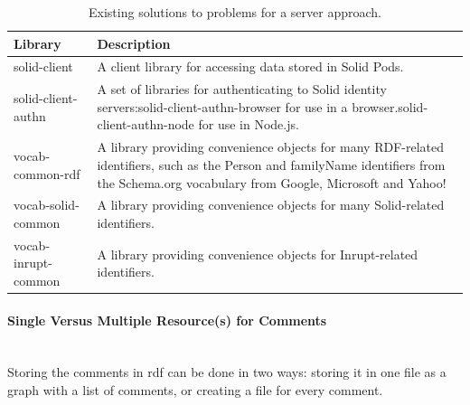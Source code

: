 \begin{table}[h!]
    \centering
    \begin{tabular}{| l | p{11cm} |} 
    \hline
     Library & Description \\
     \hline
      solid-client & A client library for accessing data stored in Solid Pods.  \\
      \hline
      solid-client-authn & A set of libraries for authenticating to Solid identity servers:solid-client-authn-browser for use in a browser.solid-client-authn-node for use in Node.js.  \\
      \hline
      vocab-common-rdf & A library providing convenience objects for many RDF-related identifiers, such as the Person and familyName identifiers from the Schema.org vocabulary from Google, Microsoft and Yahoo!  \\
      \hline
      vocab-solid-common & A library providing convenience objects for many Solid-related identifiers.  \\
      \hline
      vocab-inrupt-common & A library providing convenience objects for Inrupt-related identifiers.  \\
      \hline
    \end{tabular}
    \vspace{0.75cm}
    \caption{Existing solutions to problems for a server approach.}
    \label{table:2}
\end{table}

\paragraph{Single Versus Multiple Resource(s) for Comments}\mbox{}\\

Storing the comments in \gls{rdf} can be done in two ways: storing it in one file as a graph with a list of comments, or creating a file for every comment.

